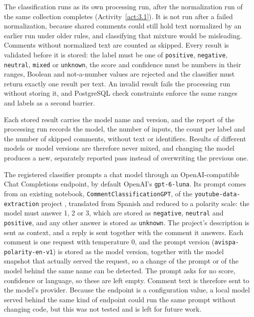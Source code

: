 The classification runs as its own processing run, after the normalization run of the same collection completes (Activity~\ref{act:3.1}). It is not run after a failed normalization, because shared comments could still hold text normalized by an earlier run under older rules, and classifying that mixture would be misleading. Comments without normalized text are counted as skipped. Every result is validated before it is stored: the label must be one of \texttt{positive}, \texttt{negative}, \texttt{neutral}, \texttt{mixed} or \texttt{unknown}, the score and confidence must be numbers in their ranges, Boolean and not-a-number values are rejected and the classifier must return exactly one result per text. An invalid result fails the processing run without storing it, and PostgreSQL check constraints enforce the same ranges and labels as a second barrier.

Each stored result carries the model name and version, and the report of the processing run records the model, the number of inputs, the count per label and the number of skipped comments, without text or identifiers. Results of different models or model versions are therefore never mixed, and changing the model produces a new, separately reported pass instead of overwriting the previous one.

The registered classifier prompts a chat model through an OpenAI-compatible Chat Completions endpoint, by default OpenAI's \texttt{gpt-6-luna}. Its prompt comes from an existing notebook, \texttt{CommentClassificationGPT}, of the \texttt{youtube-data-extraction} project \autocite{youtube_data_extraction}, translated from Spanish and reduced to a polarity scale: the model must answer 1, 2 or 3, which are stored as \texttt{negative}, \texttt{neutral} and \texttt{positive}, and any other answer is stored as \texttt{unknown}. The project's description is sent as context, and a reply is sent together with the comment it answers. Each comment is one request with temperature 0, and the prompt version (\texttt{avispa-polarity-en-v1}) is stored as the model version, together with the model snapshot that actually served the request, so a change of the prompt or of the model behind the same name can be detected. The prompt asks for no score, confidence or language, so these are left empty. Comment text is therefore sent to the model's provider. Because the endpoint is a configuration value, a local model served behind the same kind of endpoint could run the same prompt without changing code, but this was not tested and is left for future work.
